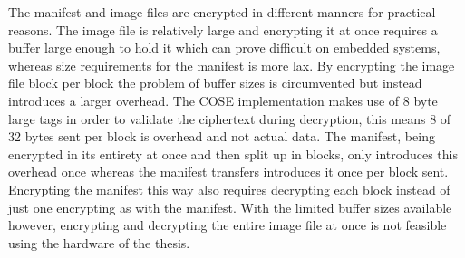 \documentclass[0-thesis.tex]{subfiles}
\begin{document}
The manifest and image files are encrypted in different manners for practical reasons. The
image file is relatively large and encrypting it at once requires a buffer large enough to
hold it which can prove difficult on embedded systems, whereas size requirements for the
manifest is more lax. By encrypting the image file block per block the problem of buffer
sizes is circumvented but instead introduces a larger overhead. The COSE implementation
makes use of 8 byte large tags in order to validate the ciphertext during decryption, this
means 8 of 32 bytes sent per block is overhead and not actual data. The manifest, being
encrypted in its entirety at once and then split up in blocks, only introduces this
overhead once whereas the manifest transfers introduces it once per block sent. Encrypting
the manifest this way also requires decrypting each block instead of just one encrypting
as with the manifest. With the limited buffer sizes available however, encrypting and
decrypting the entire image file at once is not feasible using the hardware of the thesis.
\end{document}
